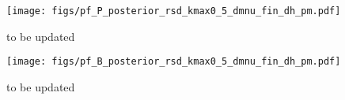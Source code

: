 \documentclass[12pt, letterpaper, preprint]{aastex62}
\begin{document}
\begin{figure}
\begin{center}
    \texttt{[image: figs/pf\_P\_posterior\_rsd\_kmax0\_5\_dmnu\_fin\_dh\_pm.pdf]}
    \caption{{to be updated}}
\label{fig:ppost_rsd}
\end{center}
\end{figure}

\begin{figure}
\begin{center}
    \texttt{[image: figs/pf\_B\_posterior\_rsd\_kmax0\_5\_dmnu\_fin\_dh\_pm.pdf]} 
    \caption{{to be updated}}
\label{fig:bpost_rsd}
\end{center}
\end{figure}
\end{document}
